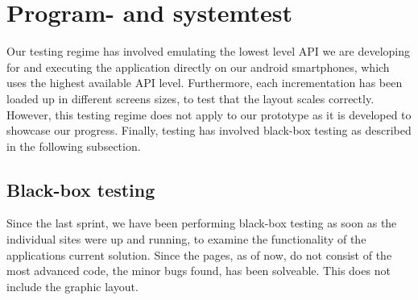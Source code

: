 \documentclass[12pt]{article}
\begin{document}
\section{Program- and systemtest}

Our testing regime has involved emulating the lowest level API we are developing for and executing the application directly on our android smartphones, which uses the highest available API level. Furthermore, each incrementation has been loaded up in different screens sizes, to test that the layout scales correctly. However, this testing regime does not apply to our prototype as it is developed to showcase our progress. Finally, testing has involved black-box testing as described in the following subsection.

\subsection{Black-box testing}
Since the last sprint, we have been performing black-box testing as soon as the individual sites were up and running, to examine the functionality of the applications current solution. Since the pages, as of now, do not consist of the most advanced code, the minor bugs found, has been solveable. This does not include the graphic layout.
\end{document}
